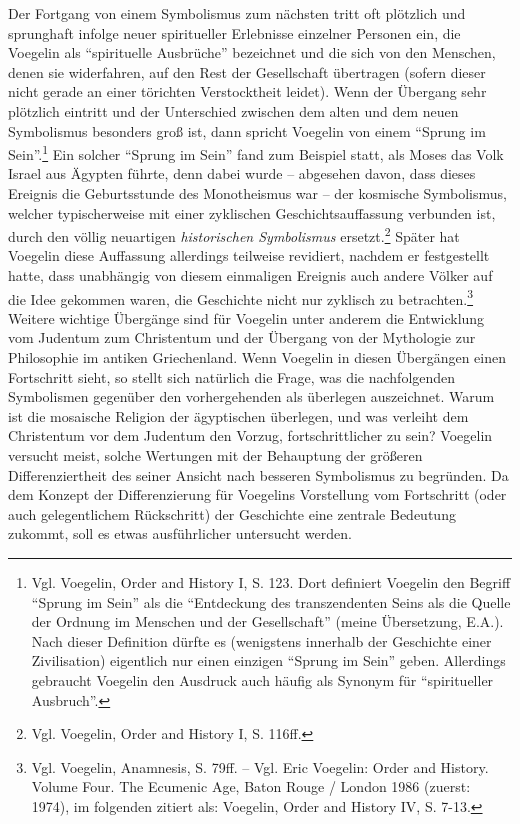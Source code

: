 Der Fortgang von einem Symbolismus zum nächsten tritt oft plötzlich und
sprunghaft infolge neuer spiritueller Erlebnisse einzelner Personen ein, die
Voegelin als "`spirituelle Ausbrüche"' bezeichnet und die sich von den
Menschen, denen sie widerfahren, auf den Rest der Gesellschaft übertragen
(sofern dieser nicht gerade an einer törichten Verstocktheit leidet). Wenn der
Übergang sehr plötzlich eintritt und der Unterschied zwischen dem alten und
dem neuen Symbolismus besonders groß ist, dann spricht Voegelin von einem
"`Sprung im Sein"'.\footnote{Vgl. Voegelin, Order and History I, S. 123. Dort
  definiert Voegelin den Begriff "`Sprung im Sein"' als die "`Entdeckung des
  transzendenten Seins als die Quelle der Ordnung im Menschen und der
  Gesellschaft"' (meine Übersetzung, E.A.). Nach dieser Definition dürfte es
  (wenigstens innerhalb der Geschichte einer Zivilisation) eigentlich nur
  einen einzigen "`Sprung im Sein"' geben. Allerdings gebraucht Voegelin den
  Ausdruck auch häufig als Synonym für "`spiritueller Ausbruch"'.} Ein solcher
"`Sprung im Sein"' fand zum Beispiel statt, als Moses das Volk Israel aus
Ägypten führte, denn dabei wurde -- abgesehen davon, dass dieses Ereignis die
Geburtsstunde des Monotheismus war -- der kosmische Symbolismus, welcher
typischerweise mit einer zyklischen Geschichtsauf\/fassung verbunden ist,
durch den völlig neuartigen {\em historischen Symbolismus}
ersetzt.\footnote{Vgl.  Voegelin, Order and History I, S. 116ff.}  Später hat
Voegelin diese Auf\/fassung allerdings teilweise revidiert, nachdem er
festgestellt hatte, dass unabhängig von diesem einmaligen Ereignis auch andere
Völker auf die Idee gekommen waren, die Geschichte nicht nur zyklisch zu
betrachten.\footnote{Vgl.  Voegelin, Anamnesis, S. 79ff. -- Vgl. Eric Voegelin:
  Order and History.  Volume Four. The Ecumenic Age, Baton Rouge / London 1986
  (zuerst: 1974), im folgenden zitiert als: Voegelin, Order and History IV, S.
  7-13.} Weitere wichtige Übergänge sind für Voegelin unter anderem die
Entwicklung vom Judentum zum Christentum und der Übergang von der Mythologie
zur Philosophie im antiken Griechenland. Wenn Voegelin in diesen Übergängen
einen Fortschritt sieht, so stellt sich natürlich die Frage, was die
nachfolgenden Symbolismen gegenüber den vorhergehenden als überlegen
auszeichnet.  Warum ist die mosaische Religion der ägyptischen überlegen, und
was verleiht dem Christentum vor dem Judentum den Vorzug, fortschrittlicher zu
sein?  Voegelin versucht meist, solche Wertungen mit der Behauptung der
größeren Differenziertheit des seiner Ansicht nach besseren Symbolismus zu
begründen.  Da dem Konzept der Differenzierung für Voegelins Vorstellung vom
Fortschritt (oder auch gelegentlichem Rückschritt) der Geschichte eine
zentrale Bedeutung zukommt, soll es etwas ausführlicher untersucht werden.

